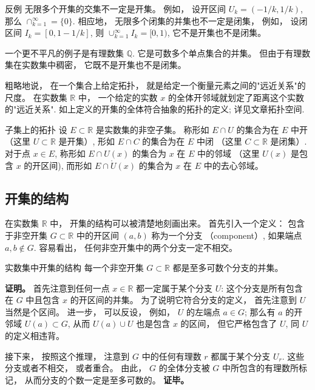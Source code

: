 \begin{example}{反例}
无限多个开集的交集不一定是开集。 例如， 设开区间 $U_k=(-1/k,1/k)$, 那么 $\cap_{k=1}^\infty=\{0\}$. 相应地， 无限多个闭集的并集也不一定是闭集， 例如， 设闭区间 $I_k=[0,1-1/k]$, 则 $\cup_{k=1}^\infty I_k=[0,1)$, 它不是开集也不是闭集。

一个更不平凡的例子是有理数集 $\mathbb{Q}$. 它是可数多个单点集合的并集。 但由于有理数集在实数集中稠密， 它既不是开集也不是闭集。
\end{example}

粗略地说， 在一个集合上给定拓扑， 就是给定一个衡量元素之间的"远近关系"的尺度。 在实数集 $\mathbb{R}$ 中， 一个给定的实数 $x$ 的全体开邻域就划定了距离这个实数的"远近关系". 如上定义的开集的全体符合抽象的拓扑的定义; 详见文章拓扑空间.

\begin{definition}{子集上的拓扑}
设 $E\subset\mathbb{R}$ 是实数集的非空子集。 称形如 $E\cap U$ 的集合为在 $E$ 中开 （这里 $U\subset\mathbb{R}$ 是开集）, 形如 $E\cap C$ 的集合为在 $E$ 中闭 （这里 $C\subset\mathbb{R}$ 是闭集）. 对于点 $x\in E$, 称形如 $E\cap U(x)$ 的集合为 $x$ 在 $E$ 中的邻域 （这里 $U(x)$ 是包含 $x$ 的开区间), 而形如 $E\cap \mathring U(x)$ 的集合为 $x$ 在 $E$ 中的去心邻域。
\end{definition}

\subsection{开集的结构}
在实数集 $\mathbb{R}$ 中， 开集的结构可以被清楚地刻画出来。 首先引入一个定义： 包含于非空开集 $G\subset\mathbb{R}$ 中的开区间 $(a,b)$ 称为一个分支 （component）, 如果端点 $a,b\notin G$. 容易看出， 任何非空开集中的两个分支一定不相交。

\begin{theorem}{实数集中开集的结构}
每一个非空开集 $G\subset\mathbb{R}$ 都是至多可数个分支的并集。 
\end{theorem}
\textbf{证明。} 首先注意到任何一点 $x\in\mathbb{R}$ 都一定属于某个分支 $U$: 这个分支是所有包含在 $G$ 中且包含 $x$ 的开区间的并集。 为了说明它符合分支的定义， 首先注意到 $U$ 当然是个区间。 进一步， 可以反设， 例如， $U$ 的左端点 $a\in G$; 那么有 $a$ 的开邻域 $U(a)\subset G$, 从而 $U(a)\cup U$ 也是包含 $x$ 的区间， 但它严格包含了 $U$, 同 $U$ 的定义相违背。

接下来， 按照这个推理， 注意到 $G$ 中的任何有理数 $r$ 都属于某个分支 $U_r$. 这些分支或者不相交， 或者重合。 由此， $G$ 的全体分支被 $G$ 中所包含的有理数所标记， 从而分支的个数一定是至多可数的。 \textbf{证毕。}

